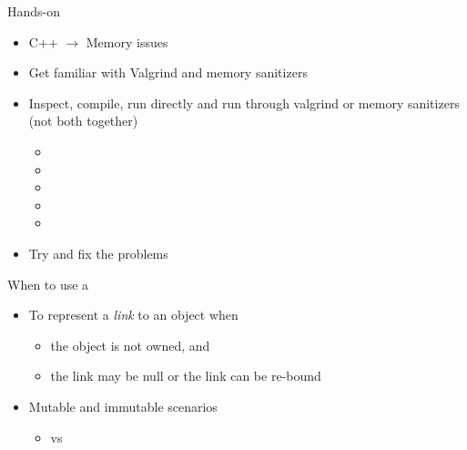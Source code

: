 \begin{frame}{Hands-on}
  \begin{itemize}
  \item C++ $\rightarrow$ Memory issues
  \item Get familiar with Valgrind and memory sanitizers
  \item Inspect, compile, run directly and run through valgrind or memory
    sanitizers (not both together)
    \begin{itemize}
    \item {}
    \item {}
    \item {}
    \item {}
    \item {}
    \end{itemize}
  \item Try and fix the problems
  \end{itemize}
\end{frame}

\begin{frame}{When to use a }
  \begin{itemize}
  \item To represent a \textit{link} to an object when
    \begin{itemize}
    \item the object is not owned, and
    \item the link may be null or the link can be re-bound
    \end{itemize}
  \item Mutable and immutable scenarios
    \begin{itemize}
    \item {} vs 
    \end{itemize}
  \end{itemize}
\end{frame}

